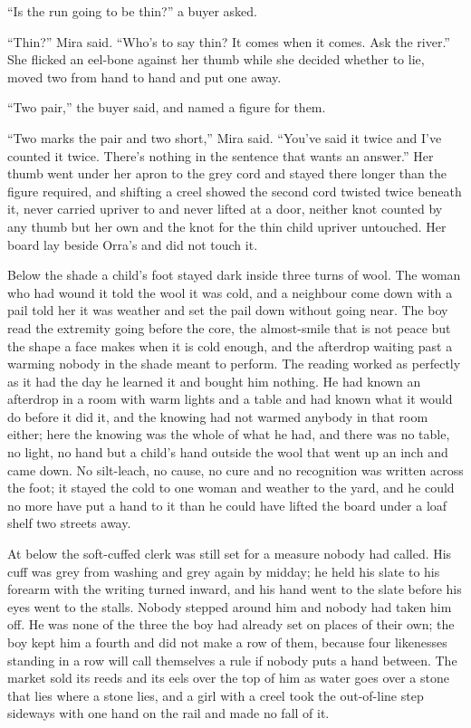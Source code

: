 “Is the run going to be thin?” a buyer asked.

“Thin?” Mira said. “Who's to say thin? It comes when it comes. Ask the river.” She flicked an eel-bone against her thumb while she decided whether to lie, moved two from hand to hand and put one away.

“Two pair,” the buyer said, and named a figure for them.

“Two marks the pair and two short,” Mira said. “You've said it twice and I've counted it twice. There's nothing in the sentence that wants an answer.” Her thumb went under her apron to the grey cord and stayed there longer than the figure required, and shifting a creel showed the second cord twisted twice beneath it, never carried upriver to  and never lifted at a door, neither knot counted by any thumb but her own and the knot for the thin child upriver untouched. Her board lay beside Orra's and did not touch it.

Below the shade a child's foot stayed dark inside three turns of wool. The woman who had wound it told the wool it was cold, and a neighbour come down with a pail told her it was weather and set the pail down without going near. The boy read the extremity going before the core, the almost-smile that is not peace but the shape a face makes when it is cold enough, and the afterdrop waiting past a warming nobody in the shade meant to perform. The reading worked as perfectly as it had the day he learned it and bought him nothing. He had known an afterdrop in a room with warm lights and a table and had known what it would do before it did it, and the knowing had not warmed anybody in that room either; here the knowing was the whole of what he had, and there was no table, no light, no hand but a child's hand outside the wool that went up an inch and came down. No silt-leach, no cause, no cure and no recognition was written across the foot; it stayed the cold to one woman and weather to the yard, and he could no more have put a hand to it than he could have lifted the board under a loaf shelf two streets away.

At  below  the soft-cuffed clerk was still set for a measure nobody had called. His cuff was grey from washing and grey again by midday; he held his slate to his forearm with the writing turned inward, and his hand went to the slate before his eyes went to the stalls. Nobody stepped around him and nobody had taken him off. He was none of the three the boy had already set on places of their own; the boy kept him a fourth and did not make a row of them, because four likenesses standing in a row will call themselves a rule if nobody puts a hand between. The market sold its reeds and its eels over the top of him as water goes over a stone that lies where a stone lies, and a girl with a creel took the out-of-line step sideways with one hand on the rail and made no fall of it.

